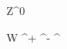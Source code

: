 
\newmathsymbol{\Zboson}      {Z^0}

\newmathsymbol{\Wboson}      {W}
\newmathsymbol{\Wp}          {\Wboson^+}
\newmathsymbol{\Wm}          {\Wboson^-}
\newmathsymbol{\Wpm}         {\Wboson^\pm}
